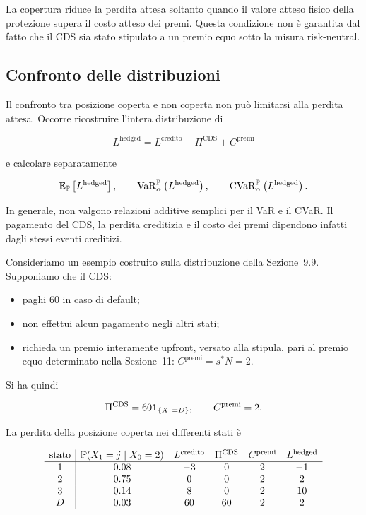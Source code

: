 La copertura riduce la perdita attesa soltanto quando il valore atteso
fisico della protezione supera il costo atteso dei premi. Questa
condizione non \`{e} garantita dal fatto che il CDS sia stato stipulato
a un premio equo sotto la misura risk-neutral.

\subsection{Confronto delle distribuzioni}

\label{subsec:cap9-confronto-distribuzioni-copertura}

Il confronto tra posizione coperta e non coperta non pu\`{o} limitarsi
alla perdita attesa. Occorre ricostruire l'intera distribuzione di

\[
L^{\mathrm{hedged}}
=
L^{\mathrm{credito}}
-
\Pi^{\mathrm{CDS}}
+
C^{\mathrm{premi}}
\]

e calcolare separatamente

\[
\mathbb{E}_{\mathbb{P}}
\left[
L^{\mathrm{hedged}}
\right],
\qquad
\operatorname{VaR}_{\alpha}^{\mathbb{P}}
\left(
L^{\mathrm{hedged}}
\right),
\qquad
\operatorname{CVaR}_{\alpha}^{\mathbb{P}}
\left(
L^{\mathrm{hedged}}
\right).
\]

In generale, non valgono relazioni additive semplici per il VaR e il
CVaR. Il pagamento del CDS, la perdita creditizia e il costo dei premi
dipendono infatti dagli stessi eventi creditizi.

Consideriamo un esempio costruito sulla distribuzione della
Sezione~9.9. Supponiamo che il CDS:

\begin{itemize}

\item paghi $60$ in caso di default;

\item non effettui alcun pagamento negli altri stati;

\item richieda un premio interamente upfront, versato alla stipula,
pari al premio equo determinato nella Sezione~11:
$C^{\mathrm{premi}}=s^{*}N=2$.

\end{itemize}

Si ha quindi

\[
\Pi^{\mathrm{CDS}}
=
60\mathbf{1}_{\{X_1=D\}},
\qquad
C^{\mathrm{premi}}=2.
\]

La perdita della posizione coperta nei differenti stati \`{e}

\[
\begin{array}{c|ccccc}
\text{stato}
&
\mathbb{P}(X_1=j\mid X_0=2)
&
L^{\mathrm{credito}}
&
\Pi^{\mathrm{CDS}}
&
C^{\mathrm{premi}}
&
L^{\mathrm{hedged}}
\\
\hline
1
&
0.08
&
-3
&
0
&
2
&
-1
\\
2
&
0.75
&
0
&
0
&
2
&
2
\\
3
&
0.14
&
8
&
0
&
2
&
10
\\
D
&
0.03
&
60
&
60
&
2
&
2
\end{array}
\]

